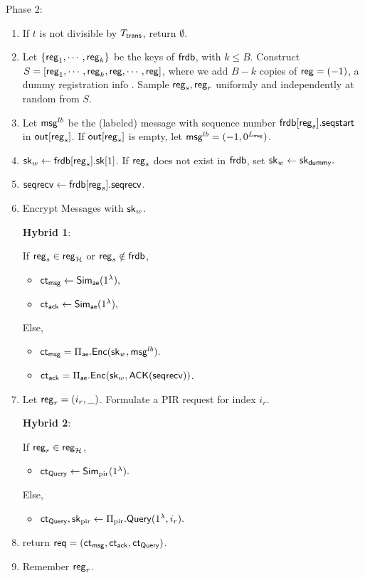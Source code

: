 Phase 2:
\begin{enumerate}
    \item If $t$ is not divisible by $T_{\mathsf{trans}}$, return $\emptyset$.
    \item Let $\{\mathsf{reg}_1, \cdots, \mathsf{reg}_k\}$ be the keys of $\mathsf{frdb}$, with $k\leq B$. Construct $S = [\mathsf{reg}_1,\cdots, \mathsf{reg}_k, \mathsf{reg}, \cdots, \mathsf{reg}]$, where we add $B - k$ copies of $\mathsf{reg} = (-1)$, a dummy registration info . Sample $\mathsf{reg}_s, \mathsf{reg}_r$ uniformly and independently at random from $S$. 
    \item Let $\mathsf{msg}^{lb}$ be the (labeled) message with sequence number $\mathsf{frdb}[\mathsf{reg}_s].\mathsf{seqstart}$ in $\mathsf{out}[\mathsf{reg}_s]$. If $\mathsf{out}[\mathsf{reg}_s]$ is empty, let $\mathsf{msg}^{lb} = (-1, 0^{L_{\mathsf{msg}}})$.
    \item ${\mathsf{sk}}_w \leftarrow \mathsf{frdb}[\mathsf{reg}_s].{\mathsf{sk}}[1]$. If $\mathsf{reg}_s$ does not exist in $\mathsf{frdb}$, set ${\mathsf{sk}}_w \leftarrow {\ensuremath{\mathsf{sk}}}_{\mathsf{dummy}}.$
    \item $\mathsf{seqrecv} \leftarrow \mathsf{frdb}[\mathsf{reg}_s].\mathsf{seqrecv}$.
    \item Encrypt Messages with ${\mathsf{sk}}_w$.

    \begin{siderule}
        { 
        \textbf{Hybrid 1}:
        
        If $\mathsf{reg}_s \in \mathsf{reg}_{\mathcal{H}}$ or $\mathsf{reg}_s \notin \mathsf{frdb}$,
        \begin{itemize}
            \item $\mathsf{ct}_{\mathsf{msg}} \leftarrow \mathsf{Sim}_{\mathsf{ae}}(1^{\lambda}),$
            \item $\mathsf{ct}_{\mathsf{ack}} \leftarrow \mathsf{Sim}_{\mathsf{ae}}(1^{\lambda}),$
        \end{itemize}
        Else, 
        }
    \end{siderule}
    
    
    \begin{itemize}
        \item $\mathsf{ct}_{\mathsf{msg}} = \Pi_{\mathsf{ae}}.\mathsf{Enc}({\mathsf{sk}}_w, \mathsf{msg}^{lb}).$
        \item $\mathsf{ct}_{\mathsf{ack}} = \Pi_{\mathsf{ae}}.\mathsf{Enc}({\mathsf{sk}}_w, \mathsf{ACK}(\mathsf{seqrecv}))$.
    \end{itemize}
    \item Let $\mathsf{reg}_r = (i_r, \_)$. Formulate a PIR request for index $i_r$. 

     \begin{siderule}
     {
     
          
     \textbf{Hybrid 2}:
         
     If $\mathsf{reg}_r \in \mathsf{reg}_{\mathcal{H}}$,
    \begin{itemize}
        \item $\mathsf{ct}_{\mathsf{Query}} \leftarrow \mathsf{Sim}_{\text{pir}}(1^{\lambda}).$
    \end{itemize}
    Else, 
    }
    \end{siderule}
    \begin{itemize}
        \item $\mathsf{ct}_{\mathsf{Query}}, {\mathsf{sk}}_{\text{pir}} \leftarrow \Pi_{\text{pir}}.\mathsf{Query}(1^{\lambda}, i_r).$
    \end{itemize}
    \item return $\mathsf{req} = (\mathsf{ct}_{\mathsf{msg}}, \mathsf{ct}_{\mathsf{ack}}, \mathsf{ct}_{\mathsf{Query}})$.
    \item Remember $\mathsf{reg}_r$.
\end{enumerate}
